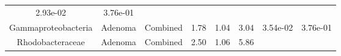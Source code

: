 \documentclass[12pt,]{article}
\begin{document}
\begin{longtable}[]{@{}cccccccc@{}}
\begin{minipage}[t]{0.06\columnwidth}
2.93e-02\strut
\end{minipage} & \begin{minipage}[t]{0.06\columnwidth}\centering\strut
3.76e-01\strut
\end{minipage}\tabularnewline
\begin{minipage}[t]{0.19\columnwidth}\centering\strut
Gammaproteobacteria\strut
\end{minipage} & \begin{minipage}[t]{0.07\columnwidth}\centering\strut
Adenoma\strut
\end{minipage} & \begin{minipage}[t]{0.09\columnwidth}\centering\strut
Combined\strut
\end{minipage} & \begin{minipage}[t]{0.03\columnwidth}\centering\strut
1.78\strut
\end{minipage} & \begin{minipage}[t]{0.14\columnwidth}\centering\strut
1.04\strut
\end{minipage} & \begin{minipage}[t]{0.14\columnwidth}\centering\strut
3.04\strut
\end{minipage} & \begin{minipage}[t]{0.06\columnwidth}\centering\strut
3.54e-02\strut
\end{minipage} & \begin{minipage}[t]{0.06\columnwidth}\centering\strut
3.76e-01\strut
\end{minipage}\tabularnewline
\begin{minipage}[t]{0.19\columnwidth}\centering\strut
Rhodobacteraceae\strut
\end{minipage} & \begin{minipage}[t]{0.07\columnwidth}\centering\strut
Adenoma\strut
\end{minipage} & \begin{minipage}[t]{0.09\columnwidth}\centering\strut
Combined\strut
\end{minipage} & \begin{minipage}[t]{0.03\columnwidth}\centering\strut
2.50\strut
\end{minipage} & \begin{minipage}[t]{0.14\columnwidth}\centering\strut
1.06\strut
\end{minipage} & \begin{minipage}[t]{0.14\columnwidth}\centering\strut
5.86\strut
\end{minipage} & \begin{minipage}[t]{0.06\columnwidth}\centering\strut

\end{minipage}
\end{longtable}
\end{document}
